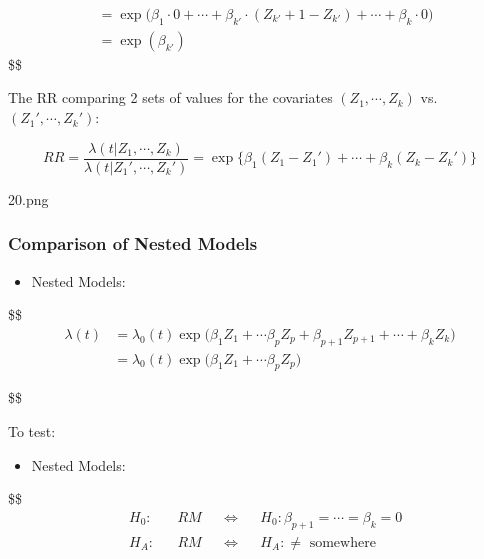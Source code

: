 \documentclass[
]{book}
\providecommand{\tightlist}{%
  \setlength{\itemsep}{0pt}\setlength{\parskip}{0pt}}
\begin{document}
{{{\begin{align}
&= \exp \Big (\beta_1 \cdot 0 + \cdots + \beta_{k'} \cdot (Z_{k'} +1 - Z_{k'}) + \cdots + \beta_k \cdot 0 \Big)

\\

&= \exp(\beta_{k'})


\end{align}
\$\$

The RR comparing 2 sets of values for the covariates \((Z_1 , \cdots, Z_k)\) vs.~\((Z_1' , \cdots, Z_k')\):

\[
RR = \frac{\lambda(t \Big | Z_1 , \cdots, Z_k)}{\lambda(t \Big | Z_1 ', \cdots, Z_k')} =\exp \Big \{ \beta_1(Z_1 - Z_1') + \cdots + \beta_k(Z_k - Z_k') \Big \}
\]

20.png

\hypertarget{comparison-of-nested-models}{%
\subsubsection{Comparison of Nested Models}\label{comparison-of-nested-models}}

\begin{itemize}
\tightlist
\item
  Nested Models:
\end{itemize}

\$\$
\begin{align}

\lambda(t) &= \lambda_0(t) \exp \Big ( \beta_1 Z_1 + \cdots \beta_p Z_p + \beta_{p+1} Z_{p+1} +\cdots + \beta_{k} Z_{k}\Big) \tag{Full Model}

\\

&= \lambda_0(t) \exp \Big ( \beta_1 Z_1 + \cdots \beta_p Z_p \Big) \tag{Reduced Model}


\end{align}

\$\$

To test:

\begin{itemize}
\tightlist
\item
  Nested Models:
\end{itemize}

\$\$
\begin{align}

&H_0:  &&RM && \Leftrightarrow && H_0: \beta_{p+1} = \cdots = \beta_k = 0
\\
&H_A:  &&RM && \Leftrightarrow && H_A:  \not = \text{ somewhere}

\end{align}

}}}
\end{document}
